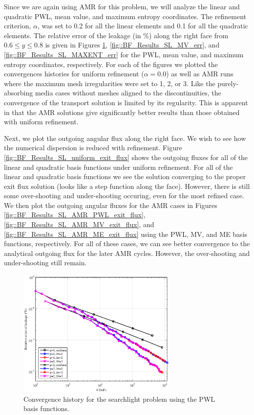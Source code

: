 Since we are again using AMR for this problem, we will analyze the linear and quadratic PWL, mean value, and maximum entropy coordinates. The refinement criterion, $\alpha$, was set to 0.2 for all the linear elements and 0.1 for all the quadratic elements. The relative error of the leakage (in \%) along the right face from $0.6 \leq y \leq 0.8$ is given in Figures \ref{fig::BF_Results_SL_PWL_err}, \ref{fig::BF_Results_SL_MV_err}, and \ref{fig::BF_Results_SL_MAXENT_err} for the PWL, mean value, and maximum entropy coordinates, respectively. For each of the figures we plotted the convergences histories for uniform refinement ($\alpha = 0.0$) as well as AMR runs where the maximum mesh irregularities were set to 1, 2, or 3. Like the purely-absorbing media cases without meshes aligned to the discontinuities, the convergence of the transport solution is limited by its regularity. This is apparent in that the AMR solutions give significantly better results than those obtained with uniform refinement. 

Next, we plot the outgoing angular flux along the right face. We wish to see how the numerical dispersion is reduced with refinement. Figure \ref{fig::BF_Results_SL_uniform_exit_flux} shows the outgoing fluxes for all of the linear and quadratic basis functions under uniform refinement. For all of the linear and quadratic basis functions we see the solution converging to the proper exit flux solution (looks like a step function along the face). However, there is still some over-shooting and under-shooting occuring, even for the most refined case. We then plot the outgoing angular fluxes for the AMR cases in Figures \ref{fig::BF_Results_SL_AMR_PWL_exit_flux}, \ref{fig::BF_Results_SL_AMR_MV_exit_flux}, and \ref{fig::BF_Results_SL_AMR_ME_exit_flux} using the PWL, MV, and ME basis functions, respectively. For all of these cases, we can see better convergence to the analytical outgoing flux for the later AMR cycles. However, the over-shooting and under-shooting still remain.

\begin{figure}
\centering
\includegraphics[width=0.70\textwidth]{figures/sec_BF/SL_PWL_Err.eps}
\caption{Convergence history for the searchlight problem using the PWL basis functions.}
\label{fig::BF_Results_SL_PWL_err}
\end{figure}


